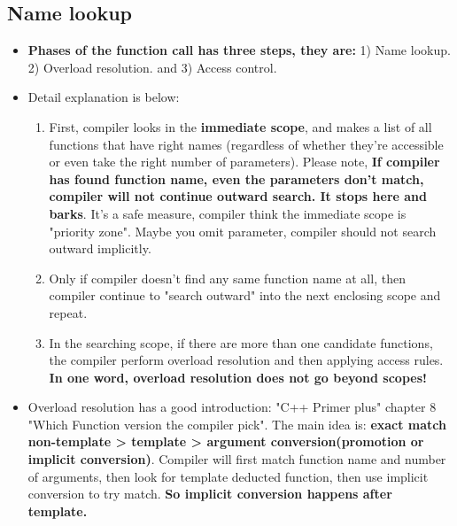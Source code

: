 \documentclass[a4paper,11pt,twoside]{book}
\begin{document}
\subsection{Name lookup}
\begin{itemize}
	
	\item \textbf{Phases of the function call has three steps, they are:} 1) Name lookup. 2) Overload resolution. and 3) Access control.
	
	\item Detail explanation is below:
	\begin{enumerate}
		\item First, compiler looks in the \textbf{immediate scope},  and makes a list of all functions that have right names  (regardless of whether they're accessible or even take the right number of parameters). Please note, \textbf{If compiler has found function name, even the parameters don't match, compiler will not continue outward search. It stops here and barks}. It's a safe measure, compiler think the immediate scope is "priority zone". Maybe you omit parameter, compiler should not search outward implicitly. 
		
		\item Only if compiler doesn't find any same function name at all, then compiler continue to "search outward" into the next enclosing scope and repeat.
		
		\item In the searching scope, if there are more than one candidate functions, the compiler perform overload resolution and then applying access rules. \textbf{In one word, overload resolution does not go beyond scopes!}
	\end{enumerate}
	
	
	\item Overload resolution has a good introduction: "C++ Primer plus" chapter 8 "Which Function version the compiler pick". The main idea is: \textbf{exact match non-template > template > argument conversion(promotion or implicit conversion)}. Compiler will first match function name and number of arguments, then look for template deducted function, then use implicit conversion to try match. \textbf{So implicit conversion happens after template.}
\end{itemize}
\end{document}
